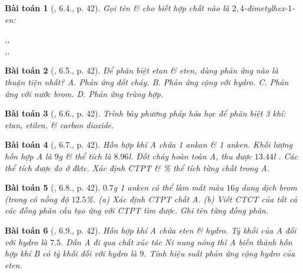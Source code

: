 \documentclass{article}
\newtheorem{baitoan}{Bài toán}
\begin{document}
\begin{baitoan}[\cite{SBT_Hoa_Hoc_11_co_ban}, 6.4., p. 42]
	Gọi tên \& cho biết hợp chất nào là $2,4$-đimetylhex-$1$-en:
	\begin{center}
		,\hspace{1cm},\\\vspace{5mm},\hspace{1cm}.
	\end{center}
\end{baitoan}

\begin{baitoan}[\cite{SBT_Hoa_Hoc_11_co_ban}, 6.5., p. 42]
	Để phân biệt etan \& eten, dùng phản ứng nào là thuận tiện nhất? {\sf A.} Phản ứng đốt cháy. {\sf B.} Phản ứng cộng với hydro. {\sf C.} Phản ứng với nước brom. {\sf D.} Phản ứng trùng hợp.
\end{baitoan}

\begin{baitoan}[\cite{SBT_Hoa_Hoc_11_co_ban}, 6.6., p. 42]
	Trình bày phương pháp hóa học để phân biệt 3 khí: etan, etilen, \& carbon dioxide.
\end{baitoan}

\begin{baitoan}[\cite{SBT_Hoa_Hoc_11_co_ban}, 6.7., p. 42]
	Hỗn hợp khí A chứa 1 ankan \& 1 anken. Khối lượng hỗn hợp A là $9$\emph{g} \& thể tích là $8.96$\emph{l}. Đốt cháy hoàn toàn A, thu được $13.44$\emph{l} \emph{}. Các thể tích được đo ở đktc. Xác định CTPT \& \% thể tích từng chất trong A.
\end{baitoan}

\begin{baitoan}[\cite{SBT_Hoa_Hoc_11_co_ban}, 6.8., p. 42]
	$0.7$\emph{g} 1 anken có thể làm mất màu $16$\emph{g} dung dịch brom (trong \emph{} có nồng độ $12.5$\%. (a) Xác định CTPT chất A. (b) Viết CTCT của tất cả các đồng phân cấu tạo ứng với CTPT tìm được. Ghi tên từng đồng phân.
\end{baitoan}

\begin{baitoan}[\cite{SBT_Hoa_Hoc_11_co_ban}, 6.9., p. 42]
	Hỗn hợp khí A chứa eten \& hydro. Tỷ khối của A đối với hydro là $7.5$. Dẫn A đi qua chất xúc tác \emph{Ni} nung nóng thì A biến thành hỗn hợp khí B có tỷ khối đối với hydro là $9$. Tính hiệu suất phản ứng cộng hydro của eten.
\end{baitoan}
\end{document}
